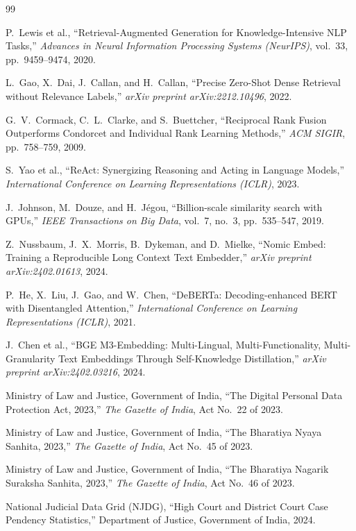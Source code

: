 \documentclass[12pt,a4paper,oneside]{report}
\begin{document}
\begin{thebibliography}{99}

P.~Lewis et al., ``Retrieval-Augmented Generation for Knowledge-Intensive NLP Tasks,'' \emph{Advances in Neural Information Processing Systems (NeurIPS)}, vol.~33, pp.~9459--9474, 2020.

L.~Gao, X.~Dai, J.~Callan, and H.~Callan, ``Precise Zero-Shot Dense Retrieval without Relevance Labels,'' \emph{arXiv preprint arXiv:2212.10496}, 2022.

G.~V.~Cormack, C.~L.~Clarke, and S.~Buettcher, ``Reciprocal Rank Fusion Outperforms Condorcet and Individual Rank Learning Methods,'' \emph{ACM SIGIR}, pp.~758--759, 2009.

S.~Yao et al., ``ReAct: Synergizing Reasoning and Acting in Language Models,'' \emph{International Conference on Learning Representations (ICLR)}, 2023.

J.~Johnson, M.~Douze, and H.~J{\'e}gou, ``Billion-scale similarity search with GPUs,'' \emph{IEEE Transactions on Big Data}, vol.~7, no.~3, pp.~535--547, 2019.

Z.~Nussbaum, J.~X.~Morris, B.~Dykeman, and D.~Mielke, ``Nomic Embed: Training a Reproducible Long Context Text Embedder,'' \emph{arXiv preprint arXiv:2402.01613}, 2024.

P.~He, X.~Liu, J.~Gao, and W.~Chen, ``DeBERTa: Decoding-enhanced BERT with Disentangled Attention,'' \emph{International Conference on Learning Representations (ICLR)}, 2021.

J.~Chen et al., ``BGE M3-Embedding: Multi-Lingual, Multi-Functionality, Multi-Granularity Text Embeddings Through Self-Knowledge Distillation,'' \emph{arXiv preprint arXiv:2402.03216}, 2024.

Ministry of Law and Justice, Government of India, ``The Digital Personal Data Protection Act, 2023,'' \emph{The Gazette of India}, Act No.~22 of 2023.

Ministry of Law and Justice, Government of India, ``The Bharatiya Nyaya Sanhita, 2023,'' \emph{The Gazette of India}, Act No.~45 of 2023.

Ministry of Law and Justice, Government of India, ``The Bharatiya Nagarik Suraksha Sanhita, 2023,'' \emph{The Gazette of India}, Act No.~46 of 2023.

National Judicial Data Grid (NJDG), ``High Court and District Court Case Pendency Statistics,'' Department of Justice, Government of India, 2024.

\end{thebibliography}
\end{document}
